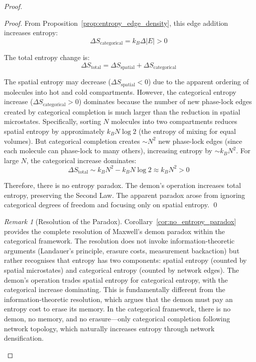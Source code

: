 \documentclass[12pt,a4paper]{article}
\theoremstyle{definition}
\theoremstyle{remark}
\newtheorem{remark}[theorem]{Remark}
\begin{document}
\begin{proof}
\begin{proof}
From Proposition~\ref{prop:entropy_edge_density}, this edge addition increases entropy:
\begin{equation}
\Delta S_{\text{categorical}} = k_B \Delta |E| > 0
\end{equation}

The total entropy change is:
\begin{equation}
\Delta S_{\text{total}} = \Delta S_{\text{spatial}} + \Delta S_{\text{categorical}}
\end{equation}

The spatial entropy may decrease ($\Delta S_{\text{spatial}} < 0$) due to the apparent ordering of molecules into hot and cold compartments. However, the categorical entropy increase ($\Delta S_{\text{categorical}} > 0$) dominates because the number of new phase-lock edges created by categorical completion is much larger than the reduction in spatial microstates. Specifically, sorting $N$ molecules into two compartments reduces spatial entropy by approximately $k_B N \log 2$ (the entropy of mixing for equal volumes). But categorical completion creates $\sim N^2$ new phase-lock edges (since each molecule can phase-lock to many others), increasing entropy by $\sim k_B N^2$. For large $N$, the categorical increase dominates:
\begin{equation}
\Delta S_{\text{total}} \sim k_B N^2 - k_B N \log 2 \approx k_B N^2 > 0
\end{equation}

Therefore, there is no entropy paradox. The demon's operation increases total entropy, preserving the Second Law. The apparent paradox arose from ignoring categorical degrees of freedom and focusing only on spatial entropy. \qed
\end{proof}

\begin{remark}[Resolution of the Paradox]
\label{rem:paradox_resolution}
Corollary~\ref{cor:no_entropy_paradox} provides the complete resolution of Maxwell's demon paradox within the categorical framework. The resolution does not invoke information-theoretic arguments (Landauer's principle, erasure costs, measurement backaction) but rather recognises that entropy has two components: spatial entropy (counted by spatial microstates) and categorical entropy (counted by network edges). The demon's operation trades spatial entropy for categorical entropy, with the categorical increase dominating. This is fundamentally different from the information-theoretic resolution, which argues that the demon must pay an entropy cost to erase its memory. In the categorical framework, there is no demon, no memory, and no erasure—only categorical completion following network topology, which naturally increases entropy through network densification.
\end{remark}


\end{proof}
\end{document}
